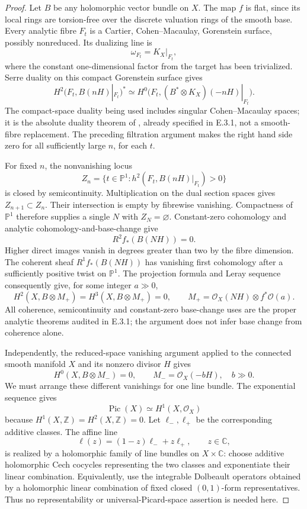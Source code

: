 \begin{proof}
Let $B$ be any holomorphic vector bundle on $X$.  The map
$f$ is flat, since its local rings are torsion-free over the
discrete valuation rings of the smooth base.  Every analytic
fibre $F_t$ is a Cartier, Cohen--Macaulay, Gorenstein surface,
possibly nonreduced.  Its dualizing line is
\[
 \omega_{F_t}=K_X|_{F_t},
\]
where the constant one-dimensional factor from the target
has been trivialized.  Serre duality on this compact
Gorenstein surface gives
\[
 H^2(F_t,B(nH)|_{F_t})^*
 \simeq H^0\bigl(F_t,(B^*\otimes K_X)(-nH)|_{F_t}\bigr).
\]
The compact-space duality being used includes singular
Cohen--Macaulay spaces; it is the absolute duality theorem
of \citet[\S3, Theorem~1, p.~81, and the complete-intersection
calculation on p.~91]{RR70push}, already specified in E.3.1,
not a smooth-fibre replacement.
The preceding filtration argument makes the right hand
side zero for all sufficiently large $n$, for each $t$.

For fixed $n$, the nonvanishing locus
\[
 Z_n=\{t\in\mathbb P^1:
        h^2(F_t,B(nH)|_{F_t})>0\}
\]
is closed by semicontinuity.  Multiplication on the dual
section spaces gives $Z_{n+1}\subset Z_n$.  Their intersection
is empty by fibrewise vanishing.  Compactness of $\mathbb P^1$
therefore supplies a single $N$ with $Z_N=\varnothing$.
Constant-zero cohomology and analytic cohomology-and-base-change
\cite[Chapter~III, Theorem~4.12(ii)]{BS76push} give
\[
 R^2f_*(B(NH))=0.
\]
Higher direct images vanish in degrees greater than two by
the fibre dimension.  The coherent sheaf $R^1f_*(B(NH))$
has vanishing first cohomology after a sufficiently positive
twist on $\mathbb P^1$.  The projection formula and Leray
sequence consequently give, for some integer $a\gg0$,
\[
 H^2(X,B\otimes M_+)=H^3(X,B\otimes M_+)=0,
 \qquad
 M_+=\mathcal O_X(NH)\otimes f^*\mathcal O(a).
\]
All coherence, semicontinuity and constant-zero base-change
uses are the proper analytic theorems audited in E.3.1;
the argument does not infer base change from coherence alone.

Independently, the reduced-space vanishing argument applied
to the connected smooth manifold $X$ and its nonzero divisor
$H$ gives
\[
 H^0(X,B\otimes M_-)=0,
 \qquad M_-=\mathcal O_X(-bH),\quad b\gg0.
\]
We must arrange these different vanishings for one line
bundle.  The exponential sequence gives
\[
 \operatorname{Pic}(X)\simeq H^1(X,\mathcal O_X)
\]
because $H^1(X,\mathbb Z)=H^2(X,\mathbb Z)=0$.
Let $\ell_-,\ell_+$ be the corresponding additive classes.
The affine line
\[
 \ell(z)=(1-z)\ell_-+z\ell_+,\qquad z\in\mathbb C,
\]
is realized by a holomorphic family of line bundles on
$X\times\mathbb C$: choose additive holomorphic Cech
cocycles representing the two classes and exponentiate their
linear combination.  Equivalently, use the integrable
Dolbeault operators obtained by a holomorphic linear
combination of fixed closed $(0,1)$-form representatives.
Thus no representability or universal-Picard-space assertion
is needed here.


\end{proof}

